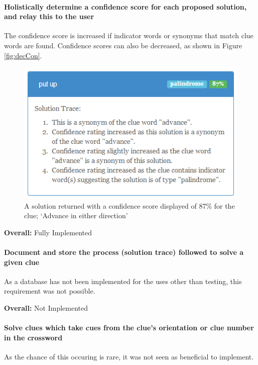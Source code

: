 \paragraph{Holistically determine a confidence score for each proposed 
solution, and relay this to the user}

The confidence score is increased if indicator words or synonyms that match clue words are found.
Confidence scores can also be decreased, as shown in Figure \ref{fig:decCon}.

\begin{figure}[H]
	\centering
	\includegraphics[keepaspectratio=true]{evidence/confidence.png}
	\caption{A solution returned with a confidence score displayed of 87\% for the clue; `Advance in either direction'}
\end{figure}

{\bf Overall:} Fully Implemented

\paragraph{Document and store the process (solution trace) followed to solve a given clue}

As a database has not been implemented for the uses other than testing, 
this requirement was not possible.

{\bf Overall:} Not Implemented

\paragraph{Solve clues which take cues from the clue's orientation
or clue number in the crossword}

As the chance of this occuring is rare, it was not seen as beneficial to 
implement. 

